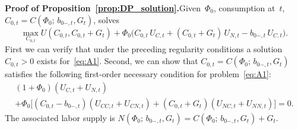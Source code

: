 \documentclass[12pt]{article}
\begin{document}
{\medskip
\noindent\textbf{Proof of Proposition~\ref{prop:DP_solution}.}\quad Given~$\Phi_0$, consumption at~$t$, $C_{0,t} = C(\Phi_0;\, b_{0-,t}, G_t)$, solves
\begin{equation}\label{eq:A1}
\max_{C_{0,t}} U(C_{0,t}, C_{0,t}+G_t) + \Phi_0\bigl(C_{0,t}\, U_{C,t} + (C_{0,t}+G_t)\, U_{N,t} - b_{0-,t}\, U_{C,t}\bigr).
\end{equation}
First we can verify that under the preceding regularity conditions a solution $C_{0,t} > 0$ exists for~\eqref{eq:A1}. Second, we can show that $C_{0,t} = C(\Phi_0;\, b_{0-,t}, G_t)$ satisfies the following first-order necessary condition for problem~\eqref{eq:A1}:
\begin{multline}\label{eq:A2}
(1+\Phi_0)(U_{C,t}+U_{N,t}) \\
+ \Phi_0\bigl[(C_{0,t}-b_{0-,t})(U_{CC,t}+U_{CN,t}) + (C_{0,t}+G_t)(U_{NC,t}+U_{NN,t})\bigr] = 0.
\end{multline}
The associated labor supply is $N(\Phi_0;\, b_{0-,t}, G_t) = C(\Phi_0;\, b_{0-,t}, G_t) + G_t$.

}
\end{document}
